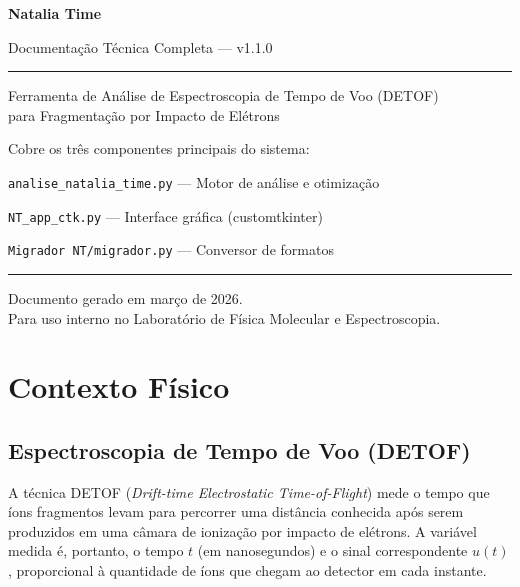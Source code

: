 \documentclass[12pt,a4paper]{report}
\begin{document}
\begin{titlepage}
  \centering
  \vspace*{2cm}
  {\Huge\bfseries\color{cinzatitulo} Natalia Time}\par
  \vspace{0.5cm}
  {\large\color{azul} Documentação Técnica Completa — v1.1.0}\par
  \vspace{1cm}
  \rule{0.8\textwidth}{1pt}\par
  \vspace{0.5cm}
  {\large Ferramenta de Análise de Espectroscopia de Tempo de Voo (DETOF)\\
  para Fragmentação por Impacto de Elétrons}\par
  \vspace{1.5cm}
  {\normalsize
    Cobre os três componentes principais do sistema:\par
    \vspace{0.3cm}
    \texttt{analise\_natalia\_time.py} — Motor de análise e otimização\par
    \texttt{NT\_app\_ctk.py} — Interface gráfica (customtkinter)\par
    \texttt{Migrador NT/migrador.py} — Conversor de formatos\par
  }
  \vspace{2cm}
  \rule{0.8\textwidth}{0.4pt}\par
  \vspace{0.5cm}
  {\small Documento gerado em março de 2026.\\
  Para uso interno no Laboratório de Física Molecular e Espectroscopia.}
\end{titlepage}

\tableofcontents
\newpage

\chapter{Contexto Físico}
\label{cap:fisica}

\section{Espectroscopia de Tempo de Voo (DETOF)}

A técnica DETOF (\textit{Drift-time Electrostatic Time-of-Flight}) mede o
tempo que íons fragmentos levam para percorrer uma distância conhecida após
serem produzidos em uma câmara de ionização por impacto de elétrons.
A variável medida é, portanto, o tempo $t$ (em nanosegundos) e o sinal
correspondente $u(t)$, proporcional à quantidade de íons que chegam ao
detector em cada instante.
\end{document}
